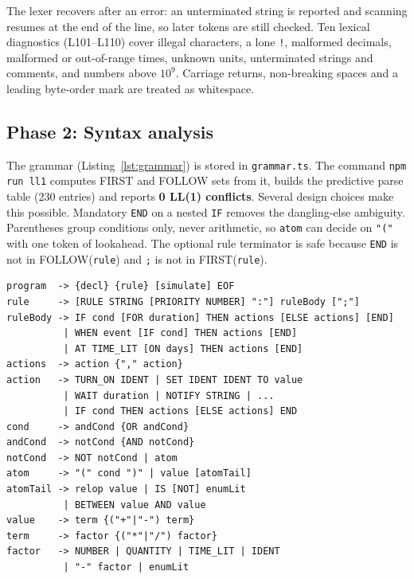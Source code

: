 \documentclass[conference]{IEEEtran}
\newcommand{\code}[1]{\texttt{#1}}
\begin{document}
The lexer recovers after an error: an unterminated string is reported and scanning resumes at the end of the line, so later tokens are still checked. Ten lexical diagnostics (L101--L110) cover illegal characters, a lone \code{!}, malformed decimals, malformed or out-of-range times, unknown units, unterminated strings and comments, and numbers above $10^9$. Carriage returns, non-breaking spaces and a leading byte-order mark are treated as whitespace.

\subsection{Phase 2: Syntax analysis}
The grammar (Listing~\ref{lst:grammar}) is stored in \code{grammar.ts}. The command \code{npm run ll1} computes FIRST and FOLLOW sets from it, builds the predictive parse table (230 entries) and reports \textbf{0 LL(1) conflicts}. Several design choices make this possible. Mandatory \code{END} on a nested \code{IF} removes the dangling-else ambiguity. Parentheses group conditions only, never arithmetic, so \code{atom} can decide on \code{"("} with one token of lookahead. The optional rule terminator is safe because \code{END} is not in FOLLOW(\code{rule}) and \code{;} is not in FIRST(\code{rule}).

\begin{lstlisting}[float=t,basicstyle=\ttfamily\tiny,caption={Core of the LL(1) grammar (EBNF).},label={lst:grammar}]
program  -> {decl} {rule} [simulate] EOF
rule     -> [RULE STRING [PRIORITY NUMBER] ":"] ruleBody [";"]
ruleBody -> IF cond [FOR duration] THEN actions [ELSE actions] [END]
          | WHEN event [IF cond] THEN actions [END]
          | AT TIME_LIT [ON days] THEN actions [END]
actions  -> action {"," action}
action   -> TURN_ON IDENT | SET IDENT IDENT TO value
          | WAIT duration | NOTIFY STRING | ...
          | IF cond THEN actions [ELSE actions] END
cond     -> andCond {OR andCond}
andCond  -> notCond {AND notCond}
notCond  -> NOT notCond | atom
atom     -> "(" cond ")" | value [atomTail]
atomTail -> relop value | IS [NOT] enumLit
          | BETWEEN value AND value
value    -> term {("+"|"-") term}
term     -> factor {("*"|"/") factor}
factor   -> NUMBER | QUANTITY | TIME_LIT | IDENT
          | "-" factor | enumLit
\end{lstlisting}
\end{document}
